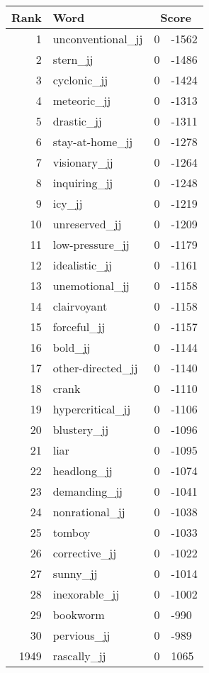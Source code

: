 \begin{longtable}[!htbp]{| rlr@{.}l |}
    \hline
    \textbf{Rank} & \textbf{Word} & \multicolumn{2}{c|}{\textbf{Score}} \\
    \hline
    \endhead
    1 & unconventional\_jj & 0 & -1562 \\
    2 & stern\_jj & 0 & -1486 \\
    3 & cyclonic\_jj & 0 & -1424 \\
    4 & meteoric\_jj & 0 & -1313 \\
    5 & drastic\_jj & 0 & -1311 \\
    6 & stay-at-home\_jj & 0 & -1278 \\
    7 & visionary\_jj & 0 & -1264 \\
    8 & inquiring\_jj & 0 & -1248 \\
    9 & icy\_jj & 0 & -1219 \\
    10 & unreserved\_jj & 0 & -1209 \\
    11 & low-pressure\_jj & 0 & -1179 \\
    12 & idealistic\_jj & 0 & -1161 \\
    13 & unemotional\_jj & 0 & -1158 \\
    14 & clairvoyant & 0 & -1158 \\
    15 & forceful\_jj & 0 & -1157 \\
    16 & bold\_jj & 0 & -1144 \\
    17 & other-directed\_jj & 0 & -1140 \\
    18 & crank & 0 & -1110 \\
    19 & hypercritical\_jj & 0 & -1106 \\
    20 & blustery\_jj & 0 & -1096 \\
    21 & liar & 0 & -1095 \\
    22 & headlong\_jj & 0 & -1074 \\
    23 & demanding\_jj & 0 & -1041 \\
    24 & nonrational\_jj & 0 & -1038 \\
    25 & tomboy & 0 & -1033 \\
    26 & corrective\_jj & 0 & -1022 \\
    27 & sunny\_jj & 0 & -1014 \\
    28 & inexorable\_jj & 0 & -1002 \\
    29 & bookworm & 0 & -990 \\
    30 & pervious\_jj & 0 & -989 \\
    1949 & rascally\_jj & 0 & 1065 \\

\end{longtable}
